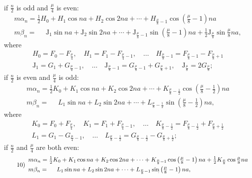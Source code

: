 \begin{landscape}
\[\begin{gathered}
\end{gathered}
\]
if \(\frac{n}{2}\) is odd and \(\frac{\mu}{4}\) is even:
\[
\tag*{8)}
\begin{array}{l}
m\alpha_n = \tfrac{1}{2}H_0 + H_1\cos na + H_2\cos 2na + \cdots + H_{\frac{\mu}{8}-1}\cos\left(\frac{\mu}{8}-1\right)na \\[4pt]
m\beta_n = \phantom{{}={}} \mathrm{J}_1\sin na + \mathrm{J}_2\sin 2na + \cdots + \mathrm{J}_{\frac{\mu}{8}-1}\sin\left(\frac{\mu}{8}-1\right)na + \tfrac{1}{2}\mathrm{J}_{\frac{\mu}{8}}\sin\frac{\mu}{8}na,
\end{array}
\]
where
\[
\begin{gathered}
H_0 = F_0 - F_{\frac{\mu}{4}}, \quad H_1 = F_1 - F_{\frac{\mu}{4}-1}, \quad \ldots \quad H_{\frac{\mu}{8}-1} = F_{\frac{\mu}{8}-1} - F_{\frac{\mu}{8}+1}\\[4pt]
\mathrm{J}_1 = G_1 + G_{\frac{\mu}{4}-1}, \quad \ldots \quad \mathrm{J}_{\frac{\mu}{8}-1} = G_{\frac{\mu}{8}-1} + G_{\frac{\mu}{8}+1}, \quad \mathrm{J}_{\frac{\mu}{8}} = 2G_{\frac{\mu}{8}};
\end{gathered}
\]
if \(\frac{n}{2}\) is even and \(\frac{\mu}{4}\) is odd:
\[
\tag*{9)}
\begin{array}{l}
m\alpha_n = \tfrac{1}{2}K_0 + K_1\cos na + K_2\cos 2na + \cdots + K_{\frac{\mu}{8}-\frac{1}{2}}\cos\left(\frac{\mu}{8}-\frac{1}{2}\right)na \\[4pt]
m\beta_n = \phantom{{}={}} L_1\sin na + L_2\sin 2na + \cdots + L_{\frac{\mu}{8}-\frac{1}{2}}\sin\left(\frac{\mu}{8}-\frac{1}{2}\right)na,
\end{array}
\]
where
\[
\begin{gathered}
K_0 = F_0 + F_{\frac{\mu}{4}}, \quad K_1 = F_1 + F_{\frac{\mu}{4}-1}, \quad \ldots \quad K_{\frac{\mu}{8}-\frac{1}{2}} = F_{\frac{\mu}{8}-\frac{1}{2}} + F_{\frac{\mu}{8}+\frac{1}{2}}\\[4pt]
L_1 = G_1 - G_{\frac{\mu}{4}-1}, \quad \ldots \quad L_{\frac{\mu}{8}-\frac{1}{2}} = G_{\frac{\mu}{8}-\frac{1}{2}} - G_{\frac{\mu}{8}+\frac{1}{2}};
\end{gathered}
\]
if \(\frac{n}{2}\) and \(\frac{\mu}{4}\) are both even:
\[
\tag*{10)}
\begin{array}{l}
m\alpha_n = \tfrac{1}{2}K_0 + K_1\cos na + K_2\cos 2na + \cdots + K_{\frac{\mu}{8}-1}\cos\left(\frac{\mu}{8}-1\right)na + \tfrac{1}{2}K_{\frac{\mu}{8}}\cos\frac{\mu}{8}na \\[4pt]
m\beta_n = \phantom{{}={}} L_1\sin na + L_2\sin 2na + \cdots + L_{\frac{\mu}{8}-1}\VtwoMarkedSin\left(\frac{\mu}{8}-1\right)na,

\end{array}\]
\end{landscape}
